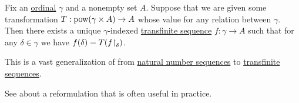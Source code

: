 \begin{theorem}\label{thm:bounded_transfinite_recursion}
  Fix an \hyperref[def:ordinal]{ordinal} \( \gamma \) and a nonempty set \( A \). Suppose that we are given some transformation \( T: \operatorname{pow}(\gamma \times A) \to A \) whose value for any relation between \( \gamma \). Then there exists a unique \( \gamma \)-indexed \hyperref[def:transfinite_sequence]{transfinite sequence} \( f: \gamma \to A \) such that for any \( \delta \in \gamma \) we have \( f(\delta) = T(f{\upharpoonright}_\delta) \).

  This is a vast generalization of  from \hyperref[def:sequence]{natural number sequences} to \hyperref[def:transfinite_sequence]{transfinite sequences}.

  See  about a reformulation that is often useful in practice.
\end{theorem}
